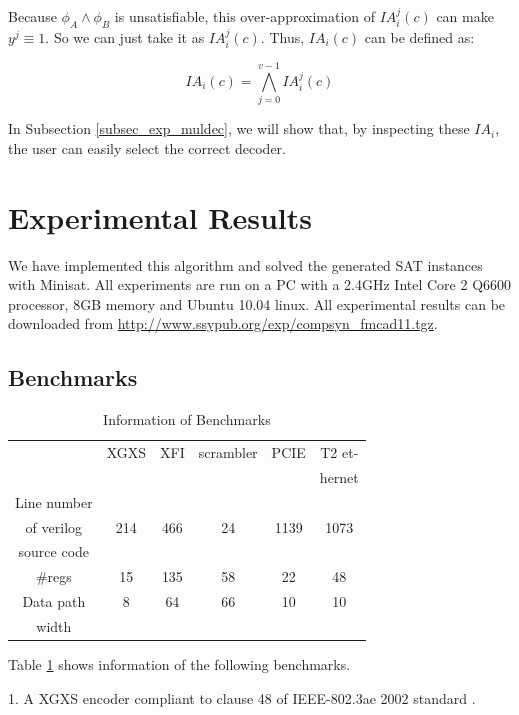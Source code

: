 \documentclass[journal]{IEEEtran}
\begin{document}
Because $\phi_A\wedge \phi_B$ is unsatisfiable,
this over-approximation of $IA^j_i(c)$ can make $y^j\equiv 1$.
So we can just take it as $IA^j_i(c)$.
Thus,
$IA_i(c)$ can be defined as:

\begin{equation}\label{equ_fd_iabit}
IA_i(c)=\bigwedge _{j=0}^{v-1} IA^j_i(c)
\end{equation}

In Subsection \ref{subsec_exp_muldec},
we will show that,
by inspecting these $IA_i$,
the user can easily select the correct decoder.

\section{Experimental Results}\label{sec_exp}
We have implemented this algorithm
and solved the generated SAT instances with Minisat\cite{EXTSAT}.
All experiments are run on a PC with a 2.4GHz Intel Core 2 Q6600 processor, 8GB memory and Ubuntu 10.04 linux.
All experimental results can be downloaded from \url{http://www.ssypub.org/exp/compsyn_fmcad11.tgz}.
\subsection{Benchmarks}

\begin{table}[t]
\centering
\caption{Information of Benchmarks}
\begin{tabular}{|c|c|c|c|c|c|}
\hline
&XGXS&XFI&scrambler&PCIE&T2 et-\\
&&&&&hernet\\\hline
Line number&&&&&\\
of verilog&214&466&24&1139&1073\\
source code&&&&&\\\hline
\#regs&15&135&58&22&48\\\hline
Data path&8&64&66&10&10\\
width&&&&&\\ \hline
\end{tabular}\label{tab_benchmark}
\end{table}




Table \ref{tab_benchmark} shows information of the following benchmarks.

1. A XGXS encoder compliant to clause 48 of IEEE-802.3ae 2002 standard \cite{IEEE80232002}.
\end{document}
